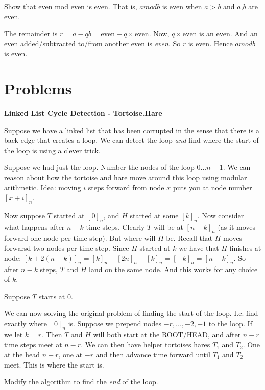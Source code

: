 \begin{example}
Show that even mod even is even. That is, $a mod b$ is even when $a > b$ and $a$,$b$ are even. 

The remainder is $r = a - qb = \text{even} - q \times \text{even}$. Now, $q \times \text{even}$ is an even.
And an even added/subtracted to/from another even is \textit{even}. So $r$ is even. Hence $a mod b$ is even.
\end{example}



\section{Problems}


\textbf{Linked List Cycle Detection - Tortoise.Hare}

Suppose we have a linked list that has been corrupted in the sense 
that there is a back-edge that creates a loop. We can detect 
the loop \textit{and} find where the start of the loop is using a 
clever trick. 


Suppose we had just the loop. Number the nodes of the 
loop 0...$n-1$. We can reason about how the 
tortoise and hare move around this loop using modular 
arithmetic. Idea: moving $i$ steps forward from node 
$x$ puts you at node number $[x + i]_n$. 

Now suppose $T$ started at $[0]_n$, and $H$ started 
at some $[k]_n$. Now consider what happens after $n-k$ time steps. 
Clearly $T$ will be at $[n-k]_n$ (as it moves forward one node per time step). 
But where will $H$ be. Recall that $H$ moves forwarsd two nodes per time step. 
Since $H$ started at $k$ we have that $H$ finishes at node:
$[k+2(n-k)]_n = [k]_n + [2n]_n - [k]_n = [-k]_n = [n-k]_n$. 
So after $n-k$ steps, $T$ and $H$ land on the same node. And this works 
for any choice of $k$. 

Suppose $T$ starts at 0. 

We can now solving the original problem of finding the start of the loop. I.e. 
find exactly where $[0]_n$ is. Suppose we prepend nodes $-r, ..., -2, -1$ to the loop. 
If we let $k = r$. Then $T$ and $H$ will both start at the ROOT/HEAD, and 
after $n-r$ time steps meet at $n-r$. We can then have helper tortoises hares $T_1$
and $T_2$. One at the head $n-r$, one at $-r$ and then advance time forward 
until $T_1$ and $T_2$ meet. This is where the start is. 

\frmrule

\begin{example}
Modify the algorithm to find the \textit{end} of the loop.
\end{example}